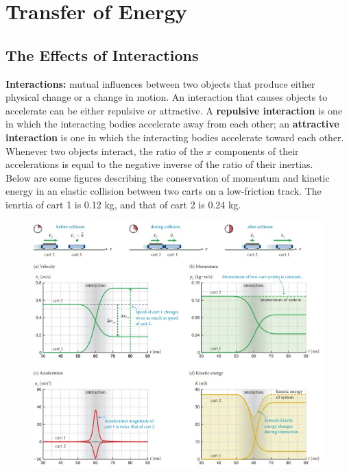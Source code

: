 \section{Transfer of Energy}

    \subsection{The Effects of Interactions}

        \textbf{Interactions:} mutual influences between two objects that produce either physical change or a change in motion. An interaction that causes objects to accelerate can be either repulsive or attractive.
        A \textbf{repulsive interaction} is one in which the interacting bodies accelerate away from each other; an \textbf{attractive interaction} is one in which the interacting bodies accelerate toward each other. \\

        Whenever two objects interact, the ratio of the $x$ components of their accelerations is equal to the negative inverse of the ratio of their inertias. \\

        Below are some figures describing the conservation of momentum and kinetic energy in an elastic collision between two carts on a low-friction track. The ienrtia of cart 1 is 0.12 kg, and that of cart 2 is 0.24 kg.

        \begin{figure}[hbt!]
            \centering
            \includegraphics[scale=1.1]{Resources/Interactions}
        \end{figure}

